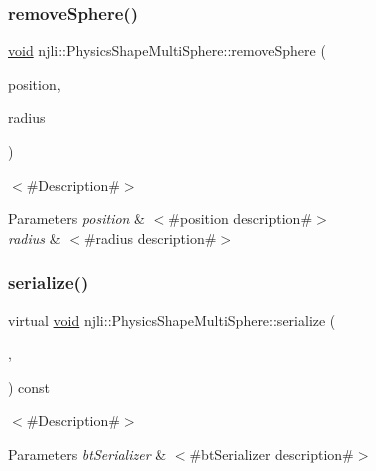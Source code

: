 \subsubsection{\texorpdfstring{remove\+Sphere()}{removeSphere()}}
{\footnotesize\ttfamily \mbox{\hyperlink{_thread_8h_af1e856da2e658414cb2456cb6f7ebc66}{void}} njli\+::\+Physics\+Shape\+Multi\+Sphere\+::remove\+Sphere (\begin{DoxyParamCaption}\item[{const bt\+Vector3 \&}]{position,  }\item[{const \mbox{\hyperlink{_util_8h_a5f6906312a689f27d70e9d086649d3fd}{f32}}}]{radius }\end{DoxyParamCaption})}

$<$\#\+Description\#$>$


\begin{DoxyParams}{Parameters}
{\em position} & $<$\#position description\#$>$ \\
\hline
{\em radius} & $<$\#radius description\#$>$ \\
\hline
\end{DoxyParams}
\mbox{\label{classnjli_1_1_physics_shape_multi_sphere_a11acca92dfad6bbfc36017267362f128}} 
\subsubsection{\texorpdfstring{serialize()}{serialize()}}
{\footnotesize\ttfamily virtual \mbox{\hyperlink{_thread_8h_af1e856da2e658414cb2456cb6f7ebc66}{void}} njli\+::\+Physics\+Shape\+Multi\+Sphere\+::serialize (\begin{DoxyParamCaption}\item[{\mbox{\hyperlink{_thread_8h_af1e856da2e658414cb2456cb6f7ebc66}{void}} $\ast$}]{,  }\item[{bt\+Serializer $\ast$}]{ }\end{DoxyParamCaption}) const\hspace{0.3cm}{\ttfamily [virtual]}}

$<$\#\+Description\#$>$


\begin{DoxyParams}{Parameters}
{\em bt\+Serializer} & $<$\#bt\+Serializer description\#$>$ \\
\hline
\end{DoxyParams}


